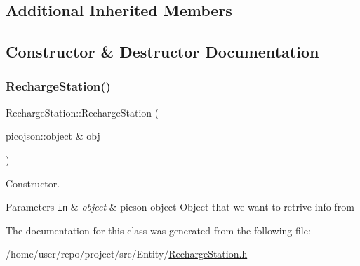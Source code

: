 \subsection*{Additional Inherited Members}


\subsection{Constructor \& Destructor Documentation}
\mbox{\label{classRechargeStation_af9b5963a59390ab4d93263d97e194622}} 
\subsubsection{\texorpdfstring{Recharge\+Station()}{RechargeStation()}}
{\footnotesize\ttfamily Recharge\+Station\+::\+Recharge\+Station (\begin{DoxyParamCaption}\item[{picojson\+::object \&}]{obj }\end{DoxyParamCaption})\hspace{0.3cm}{\ttfamily [inline]}}



Constructor. 


\begin{DoxyParams}[1]{Parameters}
\mbox{\tt in}  & {\em object} & picson object Object that we want to retrive info from \\
\hline
\end{DoxyParams}


The documentation for this class was generated from the following file\+:\begin{DoxyCompactItemize}
\item 
/home/user/repo/project/src/\+Entity/\hyperlink{RechargeStation_8h}{Recharge\+Station.\+h}\end{DoxyCompactItemize}
